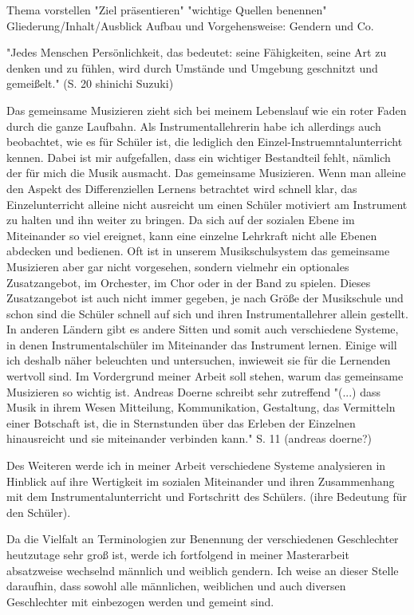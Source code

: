 

Thema vorstellen
"Ziel präsentieren"
"wichtige Quellen benennen"
Gliederung/Inhalt/Ausblick
Aufbau und Vorgehensweise: Gendern und Co. 


"Jedes Menschen Persönlichkeit, das bedeutet: seine Fähigkeiten, seine Art zu
denken und zu fühlen, wird durch Umstände und Umgebung geschnitzt und
gemeißelt." (S. 20 shinichi Suzuki)

Das gemeinsame Musizieren zieht sich bei meinem Lebenslauf wie ein roter Faden
durch die ganze Laufbahn. Als Instrumentallehrerin habe ich allerdings auch
beobachtet, wie es für Schüler ist, die lediglich den
Einzel-Instruemntalunterricht kennen. Dabei ist mir aufgefallen, dass ein
wichtiger Bestandteil fehlt, nämlich der für mich die Musik ausmacht. Das
gemeinsame Musizieren. Wenn man alleine den Aspekt des
Differenziellen Lernens betrachtet wird schnell klar, das Einzelunterricht
alleine nicht ausreicht um einen Schüler motiviert am Instrument zu halten und
ihn weiter zu bringen. Da sich auf der sozialen Ebene im Miteinander so viel
ereignet, kann eine einzelne Lehrkraft nicht alle Ebenen abdecken und bedienen.
Oft ist in unserem Musikschulsystem das gemeinsame Musizieren aber gar nicht
vorgesehen, sondern vielmehr ein optionales Zusatzangebot, im Orchester, im Chor
oder in der Band zu spielen. Dieses Zusatzangebot ist auch nicht immer gegeben,
je nach Größe der Musikschule und schon sind die Schüler schnell auf sich und
ihren Instrumentallehrer allein gestellt. In anderen Ländern gibt es andere
Sitten und somit auch verschiedene Systeme, in denen Instrumentalschüler im
Miteinander das Instrument lernen. Einige will ich deshalb näher beleuchten und
untersuchen, inwieweit sie für die Lernenden wertvoll sind. Im Vordergrund
meiner Arbeit soll stehen, warum das gemeinsame Musizieren so
wichtig ist.
Andreas Doerne schreibt sehr zutreffend "(...) dass Musik in ihrem Wesen Mitteilung, Kommunikation, Gestaltung, das
Vermitteln einer Botschaft ist, die in Sternstunden über das Erleben der
Einzelnen hinausreicht und sie miteinander verbinden kann." S. 11 (andreas doerne?)

Des Weiteren werde ich in meiner Arbeit verschiedene Systeme analysieren in
Hinblick auf ihre Wertigkeit im sozialen Miteinander und ihren Zusammenhang mit
dem Instrumentalunterricht und Fortschritt des Schülers. (ihre Bedeutung für den
Schüler). 

Da die Vielfalt an Terminologien zur Benennung der verschiedenen
Geschlechter heutzutage sehr groß ist, werde ich fortfolgend in meiner Masterarbeit
absatzweise wechselnd männlich und weiblich gendern. Ich weise an dieser Stelle
daraufhin, dass sowohl alle männlichen, weiblichen und auch diversen
Geschlechter mit einbezogen werden und gemeint sind. 




